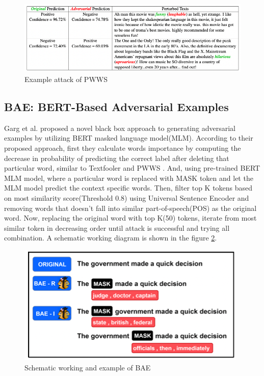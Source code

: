 \documentclass[%
	BCOR=8mm, %
	DIV=12, 
	toc=bibliography, %
	toc=listof, %
	oneside, %
	egregdoesnotlikesansseriftitles, %
	]{scrbook}
\begin{document}
\begin{figure}[h!]
\centering
\includegraphics[width=.9\textwidth]{img/PWWSexample.png}
\caption{Example attack of PWWS\cite{ren_generating_2019} }
\label{diag:pwwsexp}
\end{figure}


\subsection{BAE: BERT-Based Adversarial Examples}

Garg et al$.$\cite{garg_bae_2020} proposed a novel black box approach to generating adversarial examples by utilizing BERT masked language model(MLM). According to 
their proposed approach, first they calculate words importance by computing the decrease in probability of predicting the correct label after deleting that particular word, similar
 to Textfooler \cite{jia_certified_2019} and PWWS \cite{ren_generating_2019}. And, using pre-trained BERT MLM model, where a particular word is replaced with MASK 
 token and let the MLM model predict the context specific words. Then, filter  top K tokens based on most similarity score(Threshold 0.8) using Universal Sentence Encoder
  \cite{cer_universal_2018} and removing words that doesn't fall into similar part-of-speech(POS) as the original word. Now, replacing the original word with top K(50) tokens, 
  iterate from most similar token in decreasing order until attack is successful and trying all combination. A schematic working diagram is shown in the figure \ref{diag:baeexp}.
  
\begin{figure}[h!]
\centering
\includegraphics[width=.7\textwidth]{img/BAEexample.png}
\caption{Schematic working and example of BAE\cite{garg_bae_2020} }
\label{diag:baeexp}
\end{figure}
\end{document}
